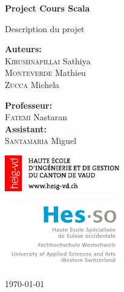 \begin{titlepage}
    \begin{center}

	 \vspace{0.5cm}
     {\fontsize{1.5cm}{1.8cm} \bf Project Cours Scala}\par
     \vspace{0.5cm}
     {\fontsize{0.9cm}{1.3cm} \selectfont Description du projet}\par
     \vspace{3cm}
     \vfill
        
        \begin{minipage}{0.4\textwidth}
        	\begin{flushleft} \large
        		\textbf{Auteurs:}\\
        		\textsc{Kirushnapillai} Sathiya \\
        		\textsc{Monteverde} Mathieu \\
        		\textsc{Zucca} Michela
        	\end{flushleft}
        \end{minipage}
        \begin{minipage}{0.4\textwidth}
            \begin{flushright} \large
                \textbf{Professeur:} \\
                \textsc{Fatemi} Nastaran \\
                \textbf{Assistant:} \\
                \textsc{Santamaria} Miguel  
            \end{flushright}
        \end{minipage}
    
        \vfill
    \begin{minipage}{0.4\textwidth}
    	\begin{flushleft} \large
       		\includegraphics[width=5cm]{images/logo_heig.png}
        \end{flushleft}

	\end{minipage}
	\begin{minipage}{0.4\textwidth}
	    \begin{flushright}
			\includegraphics[width=5cm]{images/logo-hes-so.jpg}
		\end{flushright}
	\end{minipage}


        \today
        
    \end{center}
\end{titlepage}
